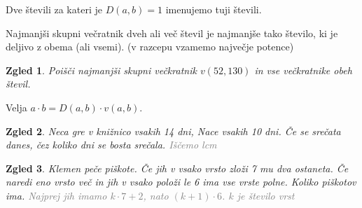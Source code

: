 \documentclass{article}
\newtheorem*{zgled}{Zgled}
\begin{document}
Dve števili za kateri je $D(a,b)=1$ imenujemo tuji števili.

Najmanjši skupni večratnik dveh ali več števil je najmanjše tako število, ki je deljivo z obema (ali vsemi). (v razcepu vzamemo največje potence)

\begin{zgled}
    Poišči najmanjši skupni večkratnik $v(52,130)$ in vse večkratnike obeh števil.
\end{zgled}

Velja $a\cdot b=D(a,b)\cdot v(a,b)$.

\begin{zgled}
    Neca gre v knižnico vsakih 14 dni, Nace vsakih 10 dni. Če se srečata danes, čez koliko dni se bosta srečala. \textcolor{gray}{Iščemo lcm}
\end{zgled}

\begin{zgled}
    Klemen peče piškote. Če jih v vsako vrsto zloži 7 mu dva ostaneta. Če naredi eno vrsto več in jih v vsako položi le 6 ima vse vrste polne. Koliko piškotov ima. \textcolor{gray}{Najprej jih imamo $k\cdot 7 +2$, nato $(k+1)\cdot 6$. $k$ je število vrst}
\end{zgled}
\end{document}
